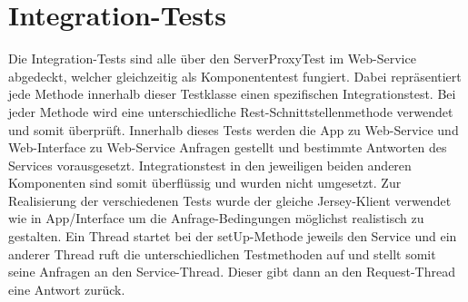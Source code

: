 \section{Integration-Tests}

Die Integration-Tests sind alle über den ServerProxyTest im Web-Service abgedeckt, welcher gleichzeitig als Komponententest fungiert. Dabei repräsentiert jede Methode innerhalb dieser Testklasse einen spezifischen Integrationstest. Bei jeder Methode wird eine unterschiedliche Rest-Schnittstellenmethode verwendet und somit überprüft. Innerhalb dieses Tests werden die App zu Web-Service und Web-Interface zu Web-Service Anfragen gestellt und bestimmte Antworten des Services vorausgesetzt. Integrationstest in den jeweiligen beiden anderen Komponenten sind somit überflüssig und wurden nicht umgesetzt. Zur Realisierung der verschiedenen Tests wurde der gleiche Jersey-Klient verwendet wie in App/Interface um die Anfrage-Bedingungen möglichst realistisch zu gestalten. Ein Thread startet bei der setUp-Methode jeweils den Service und ein anderer Thread ruft die unterschiedlichen Testmethoden auf und stellt somit seine Anfragen an den Service-Thread. Dieser gibt dann an den Request-Thread eine Antwort zurück.

